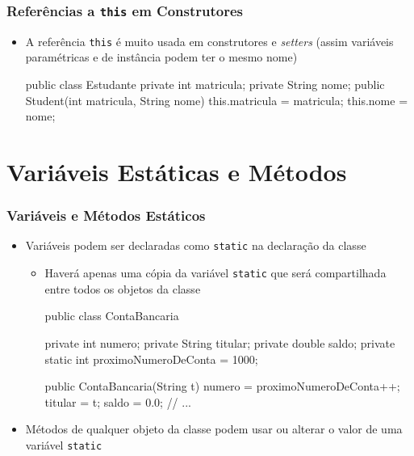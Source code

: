 \documentclass[xcolor={dvipsnames,table},aspectratio=169]{beamer}
\begin{document}
\begin{frame}[fragile]\frametitle{Referências a \texttt{this} em Construtores}
\begin{itemize}
	\item A referência \texttt{this} é muito usada em construtores e \emph{setters} (assim variáveis paramétricas e de instância podem ter o mesmo nome)
\begin{javacode}
public class Estudante {
  private int matricula;
  private String nome;
  public Student(int matricula, String nome) {
    this.matricula = matricula;
    this.nome = nome;
  }
}
\end{javacode}
\end{itemize}
\end{frame}

\section{Variáveis Estáticas e Métodos}

\begin{frame}[fragile]\frametitle{Variáveis e Métodos Estáticos}
\begin{itemize}
	\item Variáveis podem ser declaradas como \texttt{static} na declaração da classe
	\begin{itemize}
		\item Haverá apenas uma cópia da variável \texttt{static} que será compartilhada entre todos os objetos da classe
{\scriptsize
\begin{javacode}
public class ContaBancaria {
  private int numero;
  private String titular;
  private double saldo;
  private static int proximoNumeroDeConta = 1000;

  public ContaBancaria(String t) {
    numero = proximoNumeroDeConta++;
    titular = t;
    saldo = 0.0;
  }
  // ...
}
\end{javacode}
}
	\end{itemize}
	\item Métodos de qualquer objeto da classe podem usar ou alterar o valor de uma variável \texttt{static}
\end{itemize}
\end{frame}
\end{document}
